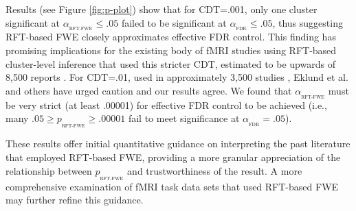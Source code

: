 \documentclass[letterpaper]{article}
\newcommand{\subtext}[2]{
#1_{_{\text{#2}}}
}
\begin{document}
Results (see Figure \ref{fig:p-plot}) show that for CDT=.001, only one cluster significant at $\subtext{\alpha}{RFT-FWE}\leq .05$ failed to be significant at $\subtext{\alpha}{FDR}\leq .05$, thus suggesting RFT-based FWE closely approximates effective FDR control.
This finding has promising implications for the existing body of fMRI studies using RFT-based cluster-level inference that used this stricter CDT, estimated to be upwards of 8,500 reports \cite{nichols_blog,woo14}.
For CDT=.01, used in approximately 3,500 studies \cite{nichols_blog,woo14}, Eklund et al. and others \cite{flandin_analysis_2016} have urged caution and our results agree. We found that $\subtext{\alpha}{RFT-FWE}$ must be very strict (at least .00001) for effective FDR control to be achieved (i.e., many $.05 \geq \subtext{p}{RFT-FWE} \geq .00001$ fail to meet significance at $\subtext{\alpha}{FDR}=.05$).


These results offer initial quantitative guidance on interpreting the past literature that employed RFT-based FWE, providing a more granular appreciation of the relationship between $\subtext{p}{RFT-FWE}$ and trustworthiness of the result.
A more comprehensive examination of fMRI task data sets that used RFT-based FWE may further refine this guidance. 


\FloatBarrier

  
\end{document}
